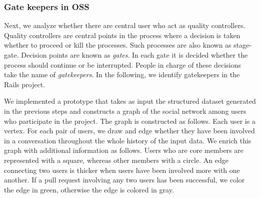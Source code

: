 \subsubsection{Gate keepers in OSS}

Next, we analyze whether there are central user who act as quality controllers. Quality controllers are central points in the process where a decision is taken whether to proceed or kill the processes. Such processes are also known as stage-gate\textregistered  \citep{cooper2008perspective}. Decision points are known as \emph{gates}. In each gate it is decided whether the process should continue or be interrupted. People in charge of these decisions take the name of \emph{gatekeepers}. In the following, we identify gatekeepers in the Rails project.

We implemented a prototype that takes as input the structured dataset generated in the previous steps and constructs a graph of the social network among users who participate in the project. The graph is constructed as follows. Each user is a vertex. For each pair of users, we draw and edge whether they have been involved in a conversation throughout the whole history of the input data. We enrich this graph with additional information as follows. Users who are core members are represented with a square, whereas other members with a circle. An edge connecting two users is thicker when users have been involved more with one another. If a pull request involving any two users has been successful, we color the edge in green, otherwise the edge is colored in gray. 

